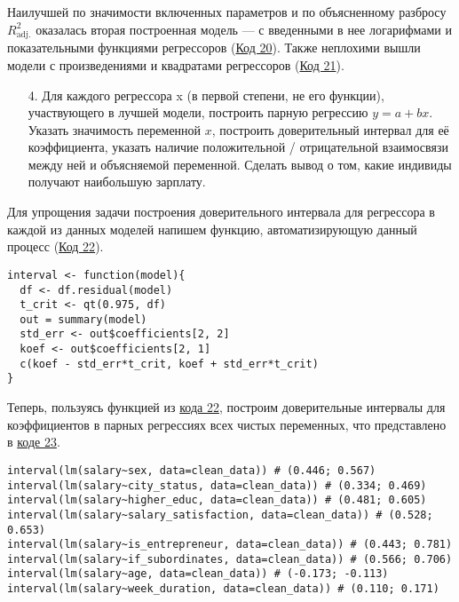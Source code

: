 Наилучшей по значимости включенных параметров и по объясненному разбросу $R^{2}_{\text{adj.}}$ оказалась вторая построенная модель --- с введенными в нее логарифмами и показательными функциями регрессоров (\hyperref[code:20]{Код 20}). Также неплохими вышли модели с произведениями и квадратами регрессоров (\hyperref[code:21]{Код 21}).

\begin{enumerate}
    \item[4.] Для каждого регрессора x (в первой степени, не его функции), участвующего в лучшей модели, построить парную регрессию $y = a + bx$. Указать значимость переменной $x$, построить доверительный интервал для её коэффициента, указать наличие положительной / отрицательной взаимосвязи между ней и объясняемой переменной. Сделать вывод о том, какие индивиды получают наибольшую зарплату.
\end{enumerate}

Для упрощения задачи построения доверительного интервала для регрессора в каждой из данных  моделей напишем функцию, автоматизирующую данный процесс (\hyperref[code:22]{Код 22}).

\begin{code}
\begin{verbatim}
interval <- function(model){
  df <- df.residual(model)
  t_crit <- qt(0.975, df)
  out = summary(model)
  std_err <- out$coefficients[2, 2]
  koef <- out$coefficients[2, 1]
  c(koef - std_err*t_crit, koef + std_err*t_crit)
}
\end{verbatim}
\label{code:22}
\end{code}

Теперь, пользуясь функцией из \hyperref[code:22]{кода 22}, построим доверительные интервалы для коэффициентов в парных регрессиях всех чистых переменных, что представлено в \hyperref[code:23]{коде 23}.

\begin{code}
\begin{verbatim}
interval(lm(salary~sex, data=clean_data)) # (0.446; 0.567)
interval(lm(salary~city_status, data=clean_data)) # (0.334; 0.469)
interval(lm(salary~higher_educ, data=clean_data)) # (0.481; 0.605)
interval(lm(salary~salary_satisfaction, data=clean_data)) # (0.528; 0.653)
interval(lm(salary~is_entrepreneur, data=clean_data)) # (0.443; 0.781)
interval(lm(salary~if_subordinates, data=clean_data)) # (0.566; 0.706)
interval(lm(salary~age, data=clean_data)) # (-0.173; -0.113)
interval(lm(salary~week_duration, data=clean_data)) # (0.110; 0.171)
\end{verbatim}
\label{code:23}
\end{code}

